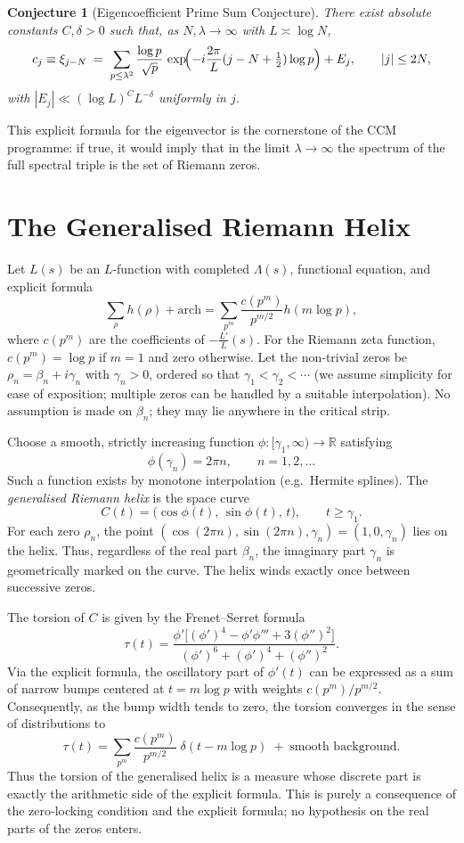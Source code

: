 \documentclass[12pt,a4paper]{article}
\newtheorem{conjecture}{Conjecture}[section]
\newcommand{\R}{\mathbb{R}}
\begin{document}
\begin{conjecture}[Eigencoefficient Prime Sum Conjecture]
There exist absolute constants $C,\delta>0$ such that, as $N,\lambda\to\infty$ with $L\asymp\log N$,
\[
c_j \equiv \xi_{j-N} \;=\; \sum_{p\le\lambda^2}\frac{\log p}{\sqrt{p}}\,
      \exp\!\Bigl(-i\frac{2\pi}{L}(j-N+\tfrac12)\log p\Bigr) + E_j,
\qquad |j|\le 2N,
\]
with $|E_j|\ll (\log L)^C L^{-\delta}$ uniformly in $j$.
\end{conjecture}
This explicit formula for the eigenvector is the cornerstone of the CCM programme: if true, it would imply that in the limit $\lambda\to\infty$ the spectrum of the full spectral triple is the set of Riemann zeros.

\section{The Generalised Riemann Helix}
Let $L(s)$ be an $L$-function with completed $\Lambda(s)$, functional equation, and explicit formula
\[
\sum_{\rho} h(\rho) + \text{arch} = \sum_{p^m} \frac{c(p^m)}{p^{m/2}} h(m\log p),
\]
where $c(p^m)$ are the coefficients of $-\frac{L'}{L}(s)$.  For the Riemann zeta function, $c(p^m)=\log p$ if $m=1$ and zero otherwise.  Let the non‑trivial zeros be $\rho_n = \beta_n + i\gamma_n$ with $\gamma_n>0$, ordered so that $\gamma_1 < \gamma_2 < \cdots$ (we assume simplicity for ease of exposition; multiple zeros can be handled by a suitable interpolation).  No assumption is made on $\beta_n$; they may lie anywhere in the critical strip.

Choose a smooth, strictly increasing function $\phi:[\gamma_1,\infty)\to\R$ satisfying
\[
\phi(\gamma_n)=2\pi n,\qquad n=1,2,\dots
\]
Such a function exists by monotone interpolation (e.g.\ Hermite splines).  The \emph{generalised Riemann helix} is the space curve
\[
C(t) = \bigl(\cos\phi(t),\,\sin\phi(t),\,t\bigr),\qquad t\ge\gamma_1.
\]
For each zero $\rho_n$, the point $( \cos(2\pi n), \sin(2\pi n), \gamma_n) = (1,0,\gamma_n)$ lies on the helix.  Thus, regardless of the real part $\beta_n$, the imaginary part $\gamma_n$ is geometrically marked on the curve.  The helix winds exactly once between successive zeros.

The torsion of $C$ is given by the Frenet--Serret formula
\[
\tau(t) = \frac{\phi'\bigl[(\phi')^4 - \phi'\phi''' + 3(\phi'')^2\bigr]}{(\phi')^6+(\phi')^4+(\phi'')^2}.
\tag{1}
\]
Via the explicit formula, the oscillatory part of $\phi'(t)$ can be expressed as a sum of narrow bumps centered at $t=m\log p$ with weights $c(p^m)/p^{m/2}$.  Consequently, as the bump width tends to zero, the torsion converges in the sense of distributions to
\[
\tau(t) = \sum_{p^m} \frac{c(p^m)}{p^{m/2}}\;\delta(t - m\log p) \;+\; \text{smooth background}.
\tag{2}
\]
Thus the torsion of the generalised helix is a measure whose discrete part is exactly the arithmetic side of the explicit formula.  This is purely a consequence of the zero‑locking condition and the explicit formula; no hypothesis on the real parts of the zeros enters.
\end{document}
